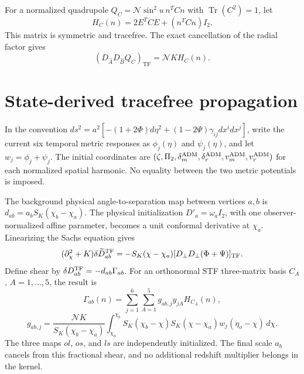 For a normalized quadrupole $Q_C=\mathcal N\sin^2u\,n^TCn$ with
$\operatorname{Tr}(C^2)=1$, let
\begin{equation}
 H_C(n)=2E^TCE+(n^TCn)I_2.
 \label{eq:quadrupole-screen-shape}
\end{equation}
This matrix is symmetric and tracefree.  The exact cancellation of the
radial factor gives
\begin{equation}
 (D_{\hat A}D_{\hat B}Q_C)_{\mathrm{TF}}
 =\mathcal N K H_C(n).
 \label{eq:quadrupole-radial-cancellation}
\end{equation}

\section{State-derived tracefree propagation}
\label{sec:tracefree-transfer}

In the convention
$ds^2=a^2[-(1+2\Phi)d\eta^2+(1-2\Psi)\gamma_{ij}dx^idx^j]$,
write the current six temporal metric responses as
$\phi_j(\eta)$ and $\psi_j(\eta)$, and let
$w_j=\phi_j+\psi_j$.
The initial coordinates are
$(\zeta,\Pi_2,\delta_m^{\rm ADM},\delta_r^{\rm ADM},
v_m^{\rm ADM},v_r^{\rm ADM})$ for each normalized spatial harmonic.
No equality between the two metric potentials is imposed.

The background physical angle-to-separation map between vertices $a,b$ is
$d_{ab}=a_bS_K(\chi_b-\chi_a)$.
The physical initialization $D'_a=\omega_aI_2$, with one
observer-normalized affine parameter, becomes a unit conformal derivative
at $\chi_a$.  Linearizing the Sachs equation gives
\begin{equation}
 (\partial_\chi^2+K)\delta\widetilde D_{ab}^{\rm TF}
 =-S_K(\chi-\chi_a)
 [D_\perp D_\perp(\Phi+\Psi)]_{\rm TF}.
 \label{eq:linearized-sachs-tf}
\end{equation}
Define shear by $\delta D_{ab}^{\rm TF}=-d_{ab}\Gamma_{ab}$.
For an orthonormal STF three-matrix basis $C_A$, $A=1,\ldots,5$,
the result is
\begin{equation}
 \Gamma_{ab}(n)=\sum_{j=1}^{6}\sum_{A=1}^{5}
 g_{ab,j}y_{jA}H_{C_A}(n),
 \label{eq:shear-response}
\end{equation}
\begin{equation}
 g_{ab,j}=\frac{\mathcal NK}{S_K(\chi_b-\chi_a)}
 \int_{\chi_a}^{\chi_b}S_K(\chi_b-\chi)S_K(\chi-\chi_a)
 w_j(\eta_o-\chi)\,d\chi.
 \label{eq:shear-kernel}
\end{equation}
The three maps $ol$, $os$, and $ls$ are independently initialized.
The final scale $a_b$ cancels from this fractional shear, and no additional
redshift multiplier belongs in the kernel.

